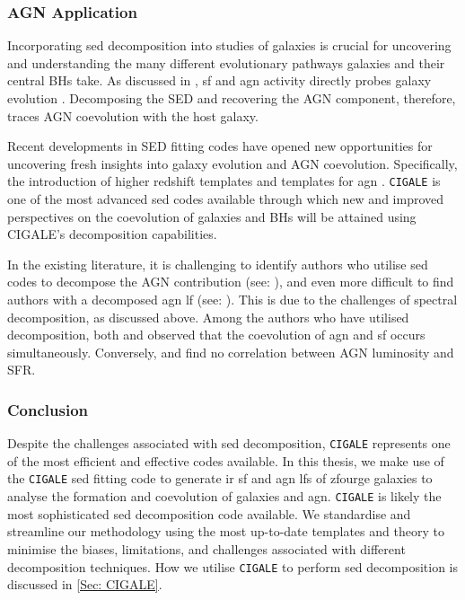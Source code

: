 \subsubsection{AGN Application}
Incorporating \gls{sed} decomposition into studies of galaxies is crucial for uncovering and understanding the many different evolutionary pathways galaxies and their central BHs take. As discussed in , \gls{sf} and \gls{agn} activity directly probes galaxy evolution \citep{huang_local_2007, ho_spectral_1999, silva_modelling_2011, gruppioni_modelling_2011}. Decomposing the SED and recovering the AGN component, therefore, traces AGN coevolution with the host galaxy. 

Recent developments in SED fitting codes have opened new opportunities for uncovering fresh insights into galaxy evolution and AGN coevolution. Specifically, the introduction of higher redshift templates \citep{dale_two-parameter_2014, steinhardt_templates_2023} and templates for \gls{agn} \citep{stalevski_3d_2012, stalevski_dust_2016}. \texttt{CIGALE} \citep{boquien_cigale_2019} is one of the most advanced \gls{sed} codes available through which new and improved perspectives on the coevolution of galaxies and BHs will be attained using CIGALE's decomposition capabilities. 

In the existing literature, it is challenging to identify authors who utilise \gls{sed} codes to decompose the AGN contribution (see: \citealp{stanley_remarkably_2015, hernan-caballero_resolving_2015, cowley_decoupled_2018, brown_infrared_2019}), and even more difficult to find authors with a decomposed \gls{agn} \gls{lf} (see: \citealp{valiante_backward_2009, fu_decomposing_2010, gruppioni_modelling_2011}). This is due to the challenges of spectral decomposition, as discussed above. Among the authors who have utilised decomposition, both \cite{fu_decomposing_2010} and \cite{brown_infrared_2019} observed that the coevolution of \gls{agn} and \gls{sf} occurs simultaneously. Conversely, \cite{stanley_remarkably_2015} and \cite{cowley_decoupled_2018} find no correlation between AGN luminosity and SFR. 

\subsubsection{Conclusion}
Despite the challenges associated with \gls{sed} decomposition, \texttt{CIGALE} represents one of the most efficient and effective codes available. In this thesis, we make use of the \texttt{CIGALE} \citep{boquien_cigale_2019} \gls{sed} fitting code to generate \gls{ir} \gls{sf} and \gls{agn} \gls{lf}s of \gls{zfourge} \citep{straatman_fourstar_2016} galaxies to analyse the formation and coevolution of galaxies and \gls{agn}. \texttt{CIGALE} is likely the most sophisticated \gls{sed} decomposition code available. We standardise and streamline our methodology using the most up-to-date templates and theory to minimise the biases, limitations, and challenges associated with different decomposition techniques. How we utilise \texttt{CIGALE} to perform \gls{sed} decomposition is discussed in \cref{Sec: CIGALE}. 

